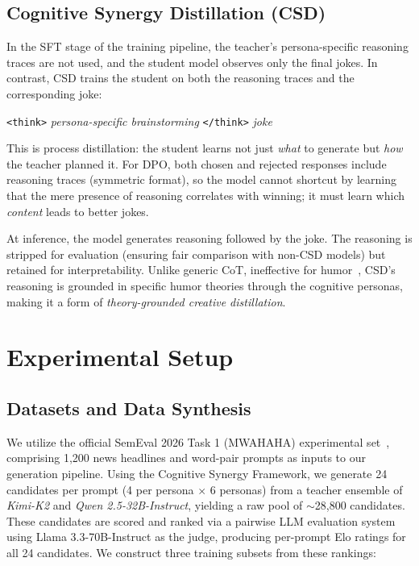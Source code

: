 \documentclass[11pt]{article}
\begin{document}
\subsection{Cognitive Synergy Distillation (CSD)}
In the SFT stage of the training pipeline, the teacher's persona-specific reasoning traces are not used, and the student model observes only the final jokes. In contrast, CSD trains the student on both the reasoning traces and the corresponding joke:

\noindent\texttt{<think>} \textit{persona-specific brainstorming} \texttt{</think>} \textit{joke}

This is process distillation: the student learns not just \textit{what} to generate but \textit{how} the teacher planned it. For DPO, both chosen and rejected responses include reasoning traces (symmetric format), so the model cannot shortcut by learning that the mere presence of reasoning correlates with winning; it must learn which \textit{content} leads to better jokes.

At inference, the model generates reasoning followed by the joke. The reasoning is stripped for evaluation (ensuring fair comparison with non-CSD models) but retained for interpretability. Unlike generic CoT, ineffective for humor~\cite{zhong_lets_2024, tikhonov_humor_2024}, CSD's reasoning is grounded in specific humor theories through the cognitive personas, making it a form of \textit{theory-grounded creative distillation}.



\section{Experimental Setup}

\subsection{Datasets and Data Synthesis}
We utilize the official SemEval 2026 Task 1 (MWAHAHA) experimental set~\cite{semeval2026mwahaha}, comprising 1,200 news headlines and word-pair prompts as inputs to our generation pipeline. Using the Cognitive Synergy Framework, we generate 24 candidates per prompt (4 per persona $\times$ 6 personas) from a teacher ensemble of \textit{Kimi-K2} and \textit{Qwen 2.5-32B-Instruct}, yielding a raw pool of $\sim$28,800 candidates. These candidates are scored and ranked via a pairwise LLM evaluation system using Llama 3.3-70B-Instruct as the judge, producing per-prompt Elo ratings for all 24 candidates. We construct three training subsets from these rankings:
\end{document}
